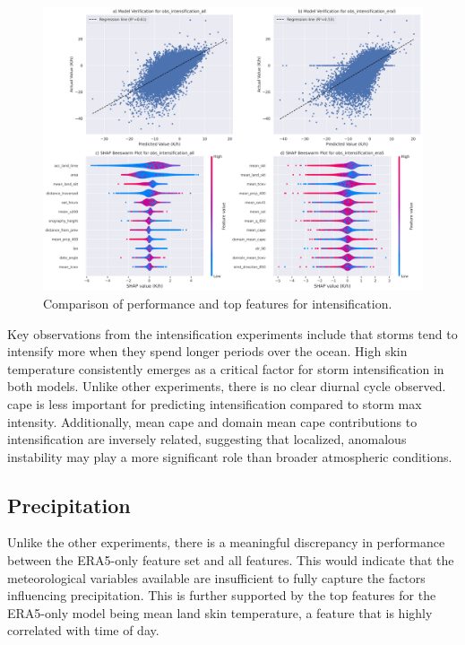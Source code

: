 \begin{figure}[ht]
    \centering
    \includegraphics[width=\textwidth]{../figures/generated/experiments/obs_intensification/obs_intensification_summary.png}
    \caption{Comparison of performance and top features for intensification.}
    \label{fig:obs_intensification_summary}
\end{figure}

Key observations from the intensification experiments include that storms tend to intensify more when they spend longer periods over the ocean. High skin temperature consistently emerges as a critical factor for storm intensification in both models. Unlike other experiments, there is no clear diurnal cycle observed. \acrshort{cape} is less important for predicting intensification compared to storm max intensity. Additionally, mean \acrshort{cape} and domain mean \acrshort{cape} contributions to intensification are inversely related, suggesting that localized, anomalous instability may play a more significant role than broader atmospheric conditions.


\clearpage
\subsection{Precipitation}

Unlike the other experiments, there is a meaningful discrepancy in performance between the ERA5-only feature set and all features. This would indicate that the meteorological variables available are insufficient to fully capture the factors influencing precipitation. This is further supported by the top features for the ERA5-only model being mean land skin temperature, a feature that is highly correlated with time of day.

